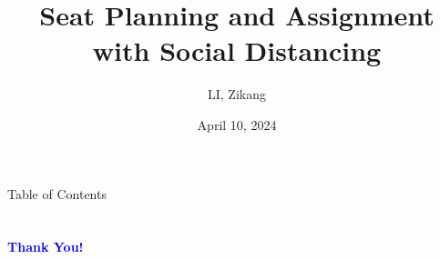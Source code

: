 \documentclass[aspectratio=43]{beamer}
\title{Seat Planning and Assignment with Social Distancing} %
\author[LI]{LI, Zikang}
\institute[HKUST]{
    IEDA%
    \\%
    The Hong Kong University of Science and Technology%
} %
\date{April 10, 2024}
\begin{document}
    \frame{\titlepage}

    \begin{frame}{Table of Contents}
        \tableofcontents
    \end{frame}
    
    
    
    
    
    
    
    
    
    

    \section{}
    \begin{frame}{}
        \centering
            \Huge\bfseries
        \textcolor{blue}{Thank You!}
    \end{frame}
\end{document}
